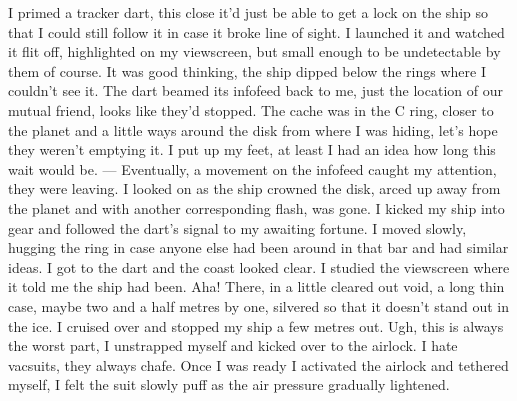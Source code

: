 I primed a tracker dart, this close it'd just be able to get a lock on the ship so that I could still follow it in case it broke line of sight. I launched it and watched it flit off, highlighted on my viewscreen, but small enough to be undetectable by them of course. It was good thinking, the ship dipped below the rings where I couldn't see it.  The dart beamed its infofeed back to me, just the location of our mutual friend, looks like they'd stopped. The cache was in the C ring, closer to the planet and a little ways around the disk from where I was hiding, let's hope they weren't emptying it. I put up my feet, at least I had an idea how long this wait would be.
\vspace{0.5mm}
\newline
---
\vspace{0.5mm}
\newline
Eventually, a movement on the infofeed caught my attention, they were leaving. I looked on as the ship crowned the disk,  arced up away from the planet and with another corresponding flash, was gone. I kicked my ship into gear and followed the dart's signal to my awaiting fortune. I moved slowly, hugging the ring in case anyone else had been around in that bar and had similar ideas. I got to the dart and the coast looked clear. I studied the viewscreen where it told me the ship had been. Aha! There, in a little cleared out void, a long thin case, maybe two and a half metres by one, silvered so that it doesn't stand out in the ice. I cruised over and stopped my ship a few metres out. Ugh, this is always the worst part, I unstrapped myself and kicked over to the airlock. I hate vacsuits, they always chafe. Once I was ready I activated the airlock and tethered myself, I felt the suit slowly puff as the air pressure gradually lightened. 

